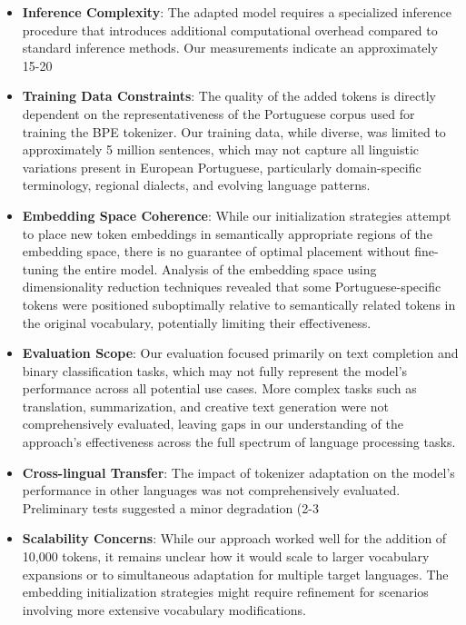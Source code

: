\begin{itemize}
    \item \textbf{Inference Complexity}: The adapted model requires a specialized inference procedure that introduces additional computational overhead compared to standard inference methods. Our measurements indicate an approximately 15-20%
    
    \item \textbf{Training Data Constraints}: The quality of the added tokens is directly dependent on the representativeness of the Portuguese corpus used for training the BPE tokenizer. Our training data, while diverse, was limited to approximately 5 million sentences, which may not capture all linguistic variations present in European Portuguese, particularly domain-specific terminology, regional dialects, and evolving language patterns.
    
    \item \textbf{Embedding Space Coherence}: While our initialization strategies attempt to place new token embeddings in semantically appropriate regions of the embedding space, there is no guarantee of optimal placement without fine-tuning the entire model. Analysis of the embedding space using dimensionality reduction techniques revealed that some Portuguese-specific tokens were positioned suboptimally relative to semantically related tokens in the original vocabulary, potentially limiting their effectiveness.
    
    \item \textbf{Evaluation Scope}: Our evaluation focused primarily on text completion and binary classification tasks, which may not fully represent the model's performance across all potential use cases. More complex tasks such as translation, summarization, and creative text generation were not comprehensively evaluated, leaving gaps in our understanding of the approach's effectiveness across the full spectrum of language processing tasks.
    
    \item \textbf{Cross-lingual Transfer}: The impact of tokenizer adaptation on the model's performance in other languages was not comprehensively evaluated. Preliminary tests suggested a minor degradation (2-3%
    
    \item \textbf{Scalability Concerns}: While our approach worked well for the addition of 10,000 tokens, it remains unclear how it would scale to larger vocabulary expansions or to simultaneous adaptation for multiple target languages. The embedding initialization strategies might require refinement for scenarios involving more extensive vocabulary modifications.
\end{itemize}

